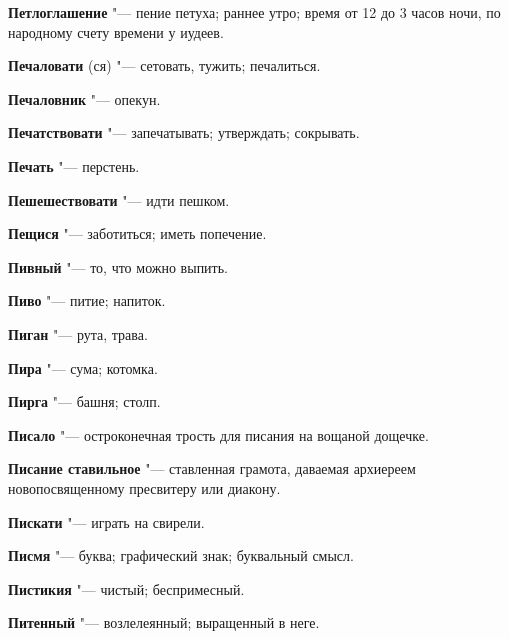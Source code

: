 \begin{mymulticols}{2}
\noindent\textbf{Петлоглашение} "--- пение петуха; раннее утро; время от 12 до 3 часов ночи, по народному счету времени у иудеев. 




\noindent\textbf{Печаловати} (ся) "--- сетовать, тужить; печалиться. 




\noindent\textbf{Печаловник} "--- опекун. 




\noindent\textbf{Печатствовати} "--- запечатывать; утверждать; сокрывать. 




\noindent\textbf{Печать} "--- перстень. 




\noindent\textbf{Пешешествовати} "--- идти пешком. 




\noindent\textbf{Пещися} "--- заботиться; иметь попечение. 




\noindent\textbf{Пивный} "--- то, что можно выпить. 




\noindent\textbf{Пиво} "--- питие; напиток. 




\noindent\textbf{Пиган} "--- рута, трава. 




\noindent\textbf{Пира} "--- сума; котомка. 




\noindent\textbf{Пирга} "--- башня; столп. 




\noindent\textbf{Писало} "--- остроконечная трость для писания на вощаной дощечке. 




\noindent\textbf{Писание ставильное} "--- ставленная грамота, даваемая архиереем новопосвященному пресвитеру или диакону. 




\noindent\textbf{Пискати} "--- играть на свирели. 




\noindent\textbf{Писмя} "--- буква; графический знак; буквальный смысл. 




\noindent\textbf{Пистикия} "--- чистый; беспримесный. 




\noindent\textbf{Питенный} "--- возлелеянный; выращенный в неге. 





\end{mymulticols}
